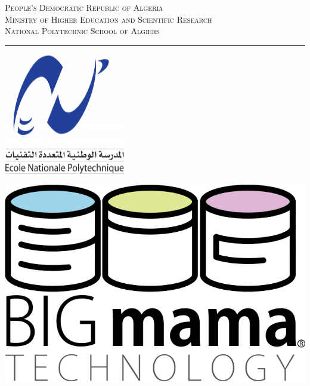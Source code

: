 {
\begin{titlepage}

    \begin{center}
        \vspace*{-3cm}
        \textsc{
            People's Democratic Republic of Algeria \\
            Ministry of Higher Education and Scientific Research \\
            National Polytechnic School of Algiers \\
        }
        \rule{\textwidth}{1pt}
    \end{center}

    \begin{center}
        \begin{minipage}{0.4\textwidth}
            \centering
            \includegraphics[width=0.6\linewidth]{title/figures/enp-logo.png}
        \end{minipage}
        \begin{minipage}{0.4\textwidth}
            \centering
            \includegraphics[width=0.6\linewidth]{title/figures/big-mama-logo.png}
        \end{minipage}
    \end{center}


\end{titlepage}}

